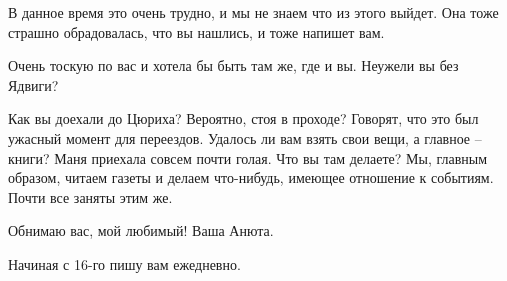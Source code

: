 В данное время это очень трудно, и мы не знаем что из этого выйдет. Она тоже
страшно обрадовалась, что вы нашлись, и тоже напишет вам.

Очень тоскую по вас и хотела бы быть там же, где и вы. Неужели вы без Ядвиги?

Как вы доехали до Цюриха? Вероятно, стоя в проходе? Говорят, что это был
ужасный момент для переездов. Удалось ли вам взять свои вещи, а главное --
книги? Маня приехала совсем почти голая. Что вы там делаете? Мы, главным
образом, читаем газеты и делаем что-нибудь, имеющее отношение к событиям.
Почти все заняты этим же.

Обнимаю вас, мой любимый! Ваша Анюта.

Начиная с 16-го пишу вам ежедневно.
